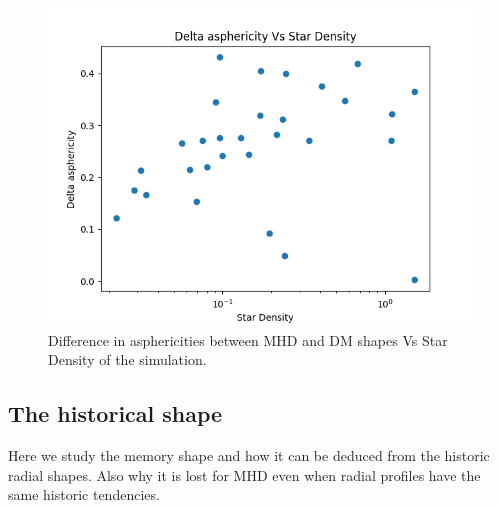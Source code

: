 \documentclass[a4paper,fleqn,usenatbib]{mnras}
\begin{document}
\begin{figure}
	\includegraphics[width=\columnwidth]{./pics/Delta asphericity Vs Star Density.png}
    \caption{Difference in asphericities between MHD and DM shapes Vs Star Density of the simulation.}
    \label{fig:Star_Density_effect}
\end{figure}

\subsection{The historical shape}
Here we study the memory shape and how it can be deduced from the historic radial shapes. Also why it is lost for MHD even when radial profiles have the same historic tendencies.
\end{document}
